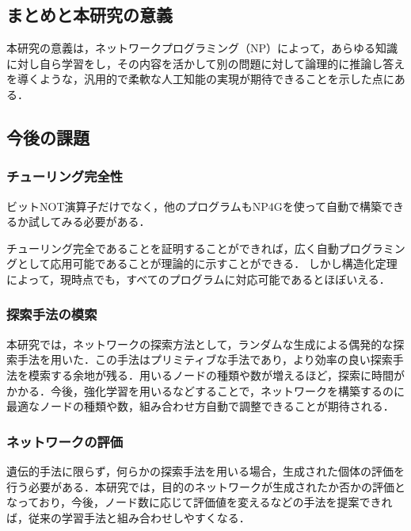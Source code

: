 \documentclass[exploratorypaper]{jsaiart} %
\begin{document}
\subsection{まとめと本研究の意義}
本研究の意義は，ネットワークプログラミング（NP）によって，あらゆる知識に対し自ら学習をし，その内容を活かして別の問題に対して論理的に推論し答えを導くような，汎用的で柔軟な人工知能の実現が期待できることを示した点にある．
\subsection{今後の課題}
\subsubsection{チューリング完全性}

ビットNOT演算子だけでなく，他のプログラムもNP4Gを使って自動で構築できるか試してみる必要がある．

チューリング完全であることを証明することができれば，広く自動プログラミングとして応用可能であることが理論的に示すことができる．
しかし構造化定理によって，現時点でも，すべてのプログラムに対応可能であるとほぼいえる．
\subsubsection{探索手法の模索}
本研究では，ネットワークの探索方法として，ランダムな生成による偶発的な探索手法を用いた．この手法はプリミティブな手法であり，より効率の良い探索手法を模索する余地が残る．用いるノードの種類や数が増えるほど，探索に時間がかかる．今後，強化学習を用いるなどすることで，ネットワークを構築するのに最適なノードの種類や数，組み合わせ方自動で調整できることが期待される．
\subsubsection{ネットワークの評価}
遺伝的手法に限らず，何らかの探索手法を用いる場合，生成された個体の評価を行う必要がある．本研究では，目的のネットワークが生成されたか否かの評価となっており，今後，ノード数に応じて評価値を変えるなどの手法を提案できれば，従来の学習手法と組み合わせしやすくなる．





\begin{biography}
\end{biography}
\end{document}

